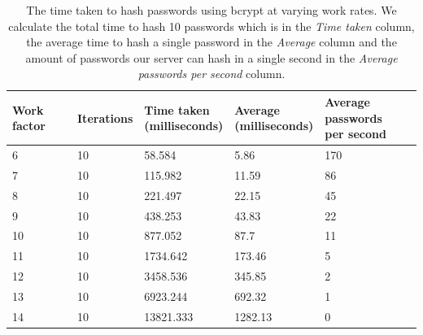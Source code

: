 \documentclass[12pt, titlepage]{article}
\begin{document}
\begin{table}[h]
	\begin{center}
    	\begin{tabular}{ | l | l | l | l | l |}
    \hline
    \textbf{Work factor} & \textbf{Iterations} & \shortstack{\textbf{Time taken} \\ \textbf{(milliseconds)}} & \shortstack{\textbf{Average} \\ \textbf{(milliseconds)}} & \shortstack{ \textbf{Average passwords} \\ \textbf{per second}} \\ \hline
    
    6 & 10 & 58.584 & 5.86 & 170 \\ \hline
    7 & 10 & 115.982 & 11.59 & 86 \\ \hline
    8 & 10 & 221.497 & 22.15 & 45 \\ \hline
    9 & 10 & 438.253 & 43.83 & 22 \\ \hline
    10 & 10 & 877.052 & 87.7 & 11 \\ \hline
    11 & 10 & 1734.642 & 173.46 & 5 \\ \hline
    12 & 10 & 3458.536 & 345.85 & 2 \\ \hline
    13 & 10 & 6923.244 & 692.32 & 1 \\ \hline
    14 & 10 & 13821.333 & 1282.13 & 0 \\ \hline
    
    \end{tabular}
    \caption{The time taken to hash passwords using bcrypt at varying work rates. We calculate the total time to hash 10 passwords which is in the \textit{Time taken} column, the average time to hash a single password in the \textit{Average} column and the amount of passwords our server can hash in a single second in the \textit{Average passwords per second} column.}
    \label{tab:bcryptWorkrates}
   \end{center}
\end{table}
\end{document}
